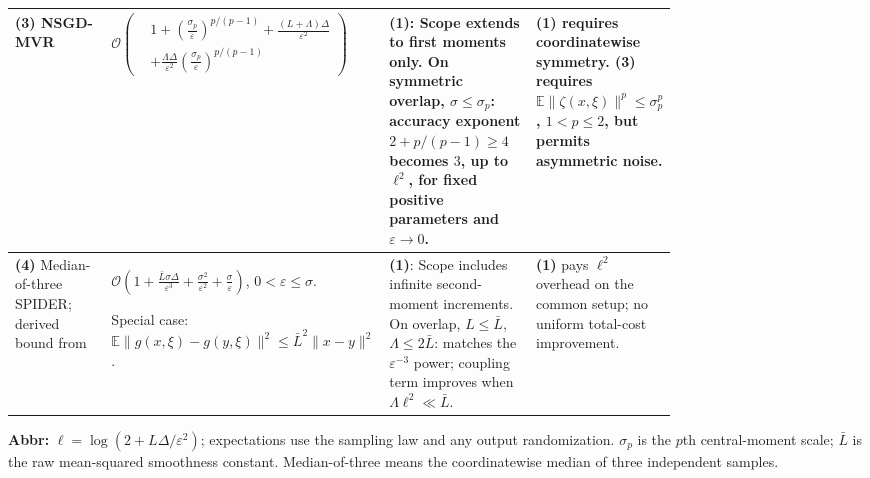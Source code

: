 \begin{table}[tp]
\begin{threeparttable}
\begin{tabularx}{\linewidth}{@{}>{\raggedright\arraybackslash}p{0.20\linewidth}>{\raggedright\arraybackslash}p{0.32\linewidth}>{\raggedright\arraybackslash}p{0.25\linewidth}>{\raggedright\arraybackslash}X@{}}
\midrule
\textbf{(3)} NSGD-MVR \citep[Thm.~4.2, $q=1$]{mshFradin2026v2}
& $\mathcal{O}\!\left(\begin{aligned}&1+\left(\frac{\sigma_p}{\varepsilon}\right)^{p/(p-1)}+\frac{(L+\Lambda)\Delta}{\varepsilon^2}\\[-2pt]&+\frac{\Lambda\Delta}{\varepsilon^2}\left(\frac{\sigma_p}{\varepsilon}\right)^{p/(p-1)}\end{aligned}\right)$
& \textbf{(1)}: Scope extends to first moments only. On symmetric overlap, $\sigma\le\sigma_p$: accuracy exponent $2+p/(p-1)\ge4$ becomes $3$, up to $\ell^2$, for fixed positive parameters and $\varepsilon\to0$.
& \textbf{(1)} requires coordinatewise symmetry. \textbf{(3)} requires $\mathbb{E}\|\zeta(x,\xi)\|^p\le\sigma_p^p$, $1<p\le2$, but permits asymmetric noise. \\
\midrule
\textbf{(4)} Median-of-three SPIDER; derived bound from \citep[Thm.~1]{ESNFang2018v2}
& $\mathcal{O}\!\left(1+\frac{\bar L\sigma\Delta}{\varepsilon^3}+\frac{\sigma^2}{\varepsilon^2}+\frac{\sigma}{\varepsilon}\right)$, $0<\varepsilon\le\sigma$.
\par Special case: $\mathbb{E}\|g(x,\xi)-g(y,\xi)\|^2\le\bar L^2\|x-y\|^2$.
& \textbf{(1)}: Scope includes infinite second-moment increments. On overlap, $L\le\bar L$, $\Lambda\le2\bar L$: matches the $\varepsilon^{-3}$ power; coupling term improves when $\Lambda\ell^2\ll\bar L$.
& \textbf{(1)} pays $\ell^2$ overhead on the common setup; no uniform total-cost improvement. \\
\bottomrule
\end{tabularx}
\begin{tablenotes}[flushleft]\footnotesize
\item[] \textbf{Abbr:} $\ell=\log(2+L\Delta/\varepsilon^2)$; expectations use the sampling law and any output randomization. $\sigma_p$ is the $p$th central-moment scale; $\bar L$ is the raw mean-squared smoothness constant. Median-of-three means the coordinatewise median of three independent samples.
\end{tablenotes}
\end{threeparttable}
\end{table}
\clearpage

